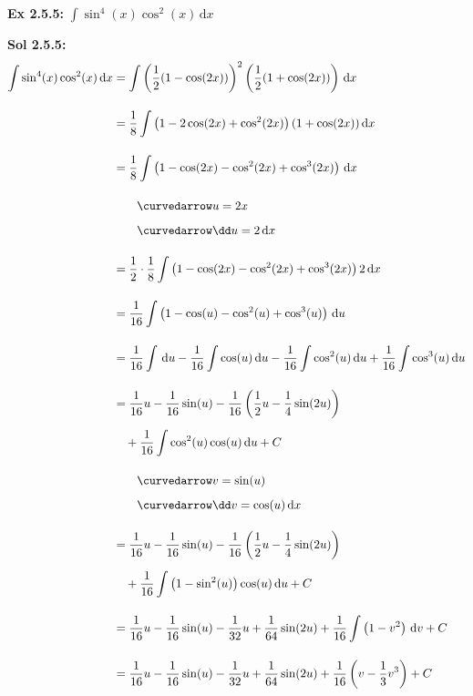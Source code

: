 \begin{tcolorbox}[example]
    \textbf{Ex 2.5.5: } $\int \sin^4 (x)\cos^2 (x) \,\mathrm{d}x$
\end{tcolorbox} 
\begin{tcolorbox}[solution]
    \textbf{Sol 2.5.5: } \begin{align*}
        \int \sin^4 (x)\cos^2 (x) \,\mathrm{d}x &= \int \left(\dfrac{1}{2}(1 - \cos (2x))\right)^2\left(\dfrac{1}{2}(1 + \cos (2x))\right) \,\mathrm{d}x \\[11pt]
        & = \dfrac{1}{8} \int \left(1 - 2\cos (2x) + \cos^2 (2x)\right)(1 + \cos (2x)) \,\mathrm{d}x \\[11pt]
        & = \dfrac{1}{8} \int \left(1 - \cos (2x) - \cos^2 (2x) + \cos^3 (2x)\right) \,\mathrm{d}x \\[11pt]
        & \qquad \curvedarrow u = 2x \\[5.5pt]
        & \qquad \curvedarrow \dd u = 2 \,\mathrm{d}x \\[11pt]
        & = \dfrac{1}{2} \cdot \dfrac{1}{8} \int \left(1 - \cos (2x) - \cos^2 (2x) + \cos^3 (2x)\right) 2 \,\mathrm{d}x \\[11pt]
        & = \dfrac{1}{16} \int \left(1 - \cos (u) - \cos^2 (u) + \cos^3 (u)\right) \,\mathrm{d}u \\[11pt]
        & = \dfrac{1}{16}\int \,\mathrm{d}u - \dfrac{1}{16}\int \cos (u) \,\mathrm{d}u - \dfrac{1}{16}\int \cos^2 (u) \,\mathrm{d}u + \dfrac{1}{16}\int \cos^3 (u) \,\mathrm{d}u \\[11pt]
        & = \dfrac{1}{16}u - \dfrac{1}{16}\sin (u) - \dfrac{1}{16}\left(\dfrac{1}{2}u - \dfrac{1}{4}\sin (2u)\right) \\[5.5pt]
        & \quad + \dfrac{1}{16}\int \cos^2 (u)\cos (u) \,\mathrm{d}u + C \\[11pt]
        & \qquad \curvedarrow v = \sin (u) \\[5.5pt]
        & \qquad \curvedarrow \dd v = \cos (u) \,\mathrm{d}x \\[11pt]
        & = \dfrac{1}{16}u - \dfrac{1}{16}\sin (u) - \dfrac{1}{16}\left(\dfrac{1}{2}u - \dfrac{1}{4}\sin (2u)\right) \\[5.5pt]
        & \quad + \dfrac{1}{16}\int \left(1 - \sin^2 (u)\right)\cos (u) \,\mathrm{d}u + C \\[11pt]
        & = \dfrac{1}{16}u - \dfrac{1}{16}\sin (u) - \dfrac{1}{32}u + \dfrac{1}{64}\sin (2u) + \dfrac{1}{16}\int \left(1 - v^2\right) \,\mathrm{d}v + C \\[11pt]
        & = \dfrac{1}{16}u - \dfrac{1}{16}\sin (u) - \dfrac{1}{32}u + \dfrac{1}{64}\sin (2u) + \dfrac{1}{16}\left(v - \dfrac{1}{3}v^3\right) + C \\[11pt]

\end{align*}
\end{tcolorbox}
